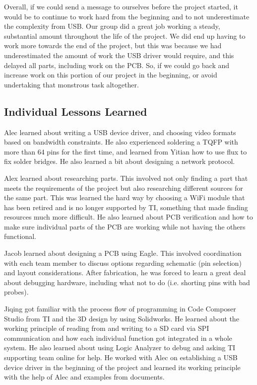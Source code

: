 \documentclass[12pt]{article}
\begin{document}
Overall, if we could send a message to ourselves before the project started, it
would be to continue to work hard from the beginning and to not underestimate
the complexity from USB. Our group did a great job working a steady,
substantial amount throughout the life of the project. We did end up having to
work more towards the end of the project, but this was because we had
underestimated the amount of work the USB driver would require, and this
delayed all parts, including work on the PCB. So, if we could go back and
increase work on this portion of our project in the beginning, or avoid
undertaking that monstrous task altogether.

\subsection{Individual Lessons Learned}
Alec learned about writing a USB device driver, and choosing video formats
based on bandwidth constraints. He also experienced soldering a TQFP with more
than 64 pins for the first time, and learned from Yitian how to use flux to fix
solder bridges. He also learned a bit about designing a network protocol.

Alex learned about researching parts. This involved not only finding a part
that meets the requirements of the project but also researching different
sources for the same part. This was learned the hard way by choosing a WiFi
module that has been retired and is no longer supported by TI, something that
made finding resources much more difficult. He also learned about PCB
verification and how to make sure individual parts of the PCB are working while
not having the others functional. 

Jacob learned about designing a PCB using Eagle. This involved coordination
with each team member to discuss options regarding schematic (pin selection)
and layout considerations. After fabrication, he was forced to learn a great
deal about debugging hardware, including what not to do (i.e. shorting pins
with bad probes).

Jiqing got familiar with the process flow of programming in Code Composer
Studio from TI and the 3D design by using Solidworks. He learned about the
working principle of reading from and writing to a SD card via SPI
communication and how each individual function got integrated in a whole
system. He also learned about using Logic Analyzer to debug and asking TI
supporting team online for help. He worked with Alec on establishing a USB
device driver in the beginning of the project and learned its working principle
with the help of Alec and examples from documents.
\end{document}
